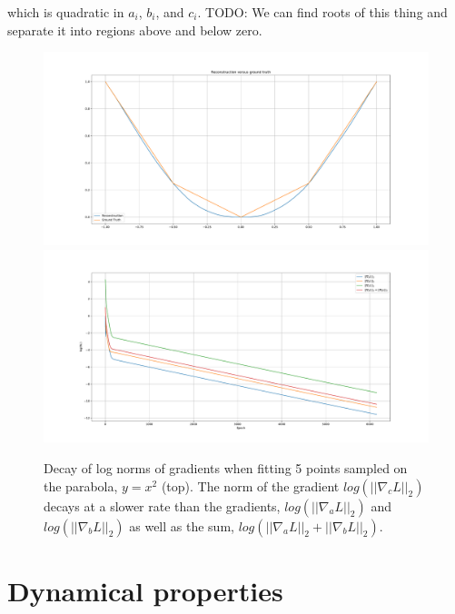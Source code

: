 \documentclass{article}
\begin{document}

which is quadratic in $a_i$, $b_i$, and $c_i$. TODO: We can find roots of this thing and separate it into regions above and below zero.

\begin{figure}[h!]
    \centering
    \includegraphics[width=\textwidth]{figures/reconstruction.pdf}
    \includegraphics[width=\textwidth]{figures/grad_decay.pdf}
    \caption{Decay of log norms of gradients when  fitting 5 points sampled on the parabola, $y=x^2$ (top). The norm of the gradient $log(||\nabla_c L||_2)$ decays at a slower rate than the gradients, $log(||\nabla_a L||_2)$ and $log(||\nabla_b L||_2)$ as well as the sum, $log(||\nabla_a L||_2 + ||\nabla_b L||_2)$. }
    \label{fig:grad_decay}
\end{figure}


\section{Dynamical properties}
\end{document}
